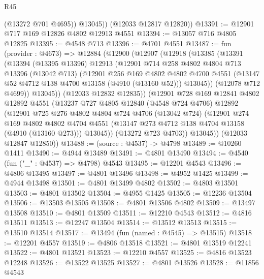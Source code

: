 \begin{lexlean}{R45}
\begin{coremodule}
            (@13272 @701 @4695))
          @13045))
      (@12033 @12817 @12820))
@13391 := @12901 @717 @169 @12826 @4802 @12913 @4551
@13394 := @13057 @716 @4805 @12825
@13395 := @4548 @713
@13396 := @4701 @4551
@13487 := fun (provider : @4673) =>
  @12884
    (@12900
      (@12907
        (@12918
          (@13385
            (@13391
              (@13394
                (@13395 @13396)
                @12913
                (@12901
                  @714
                  @258
                  @4802
                  @4804
                  @713
                  @13396
                  (@13042 @713)
                  (@12901
                    @256
                    @169
                    @4802
                    @4802
                    @4700
                    @4551
                    (@13147 @52 @4712 @138 @4700 @13158 (@4910 (@13160 @52)))
                    @13045))
                (@12078 @712 @4699))
              @13045))
          (@12033 @12832 @12835))
        (@12901
          @728
          @169
          @12841
          @4802
          @12892
          @4551
          (@13237
            @727
            @4805
            @12840
            (@4548 @724 @4706)
            @12892
            (@12901
              @725
              @276
              @4802
              @4804
              @724
              @4706
              (@13042 @724)
              (@12901
                @274
                @169
                @4802
                @4802
                @4704
                @4551
                (@13147 @273 @4712 @138 @4704 @13158 (@4910 (@13160 @273)))
                @13045))
            (@13272 @723 @4703))
          @13045))
      (@12033 @12847 @12850))
@13488 := (source : @4537) -> @4798
@13489 := @10260 @1411
@13490 := @4944 @13489
@13491 := @4801 @13490
@13494 := @4540 (fun ("_" : @4537) => @4798) @4543
@13495 := @12201 @4543
@13496 := @4806 @13495
@13497 := @4801 @13496
@13498 := @4952 @1425
@13499 := @4944 @13498
@13501 := @4801 @13499 @4802
@13502 := @4803 @13501
@13503 := @4801 @13502
@13504 := @4955 @1425
@13505 := @12236 @13504
@13506 := @13503 @13505
@13508 := @4801 @13506 @4802
@13509 := @13497 @13508
@13510 := @4801 @13509
@13511 := @12210 @4543
@13512 := @4816 @13511
@13513 := @12247 @13504
@13514 := @13512 @13513
@13515 := @13510 @13514
@13517 := @13494 (fun (named : @4545) => @13515)
@13518 := @12201 @4557
@13519 := @4806 @13518
@13521 := @4801 @13519 @12241
@13522 := @4801 @13521
@13523 := @12210 @4557
@13525 := @4816 @13523 @12248
@13526 := @13522 @13525
@13527 := @4801 @13526
@13528 := @11856 @4543

\end{coremodule}
\end{lexlean}
